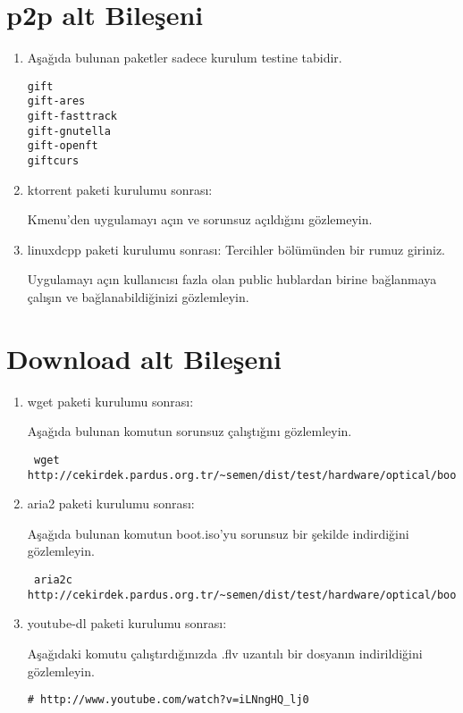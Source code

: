 \documentclass[a4paper,10pt]{article}
\begin{document}
\section{p2p alt Bileşeni}
\begin{enumerate}
 \item Aşağıda bulunan paketler sadece kurulum testine tabidir.

\begin{verbatim}
gift
gift-ares
gift-fasttrack
gift-gnutella
gift-openft
giftcurs
\end{verbatim}

\item ktorrent paketi kurulumu sonrası:

Kmenu'den uygulamayı açın ve sorunsuz açıldığını gözlemeyin. 


 \item linuxdcpp paketi kurulumu sonrası:
Tercihler bölümünden bir rumuz giriniz. 

Uygulamayı açın kullanıcısı fazla olan public hublardan birine bağlanmaya çalışın ve bağlanabildiğinizi gözlemleyin.
\end{enumerate}

\section{Download alt Bileşeni}
\begin{enumerate}
\item wget paketi kurulumu sonrası:

Aşağıda bulunan komutun sorunsuz çalıştığını gözlemleyin.
\begin{verbatim}
 wget http://cekirdek.pardus.org.tr/~semen/dist/test/hardware/optical/boot.iso
\end{verbatim}


\item aria2 paketi kurulumu sonrası:

Aşağıda bulunan komutun boot.iso'yu sorunsuz bir şekilde indirdiğini gözlemleyin.
\begin{verbatim}
 aria2c http://cekirdek.pardus.org.tr/~semen/dist/test/hardware/optical/boot.iso
\end{verbatim}

 \item youtube-dl paketi kurulumu sonrası:

Aşağıdaki komutu çalıştırdığınızda .flv uzantılı bir dosyanın indirildiğini gözlemleyin.
\begin{verbatim}
# http://www.youtube.com/watch?v=iLNngHQ_lj0
\end{verbatim}

\end{enumerate}
\end{document}

